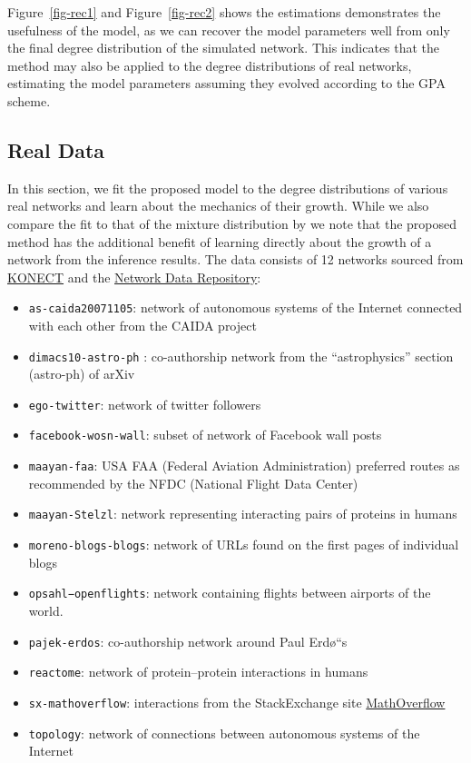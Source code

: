\documentclass[
  sn-basic,
]{sn-jnl}
\providecommand{\tightlist}{%
  \setlength{\itemsep}{0pt}\setlength{\parskip}{0pt}}
\theoremstyle{plain}
\theoremstyle{plain}
\theoremstyle{remark}
\begin{document}
Figure~\ref{fig-rec1} and Figure~\ref{fig-rec2} shows the estimations
demonstrates the usefulness of the model, as we can recover the model
parameters well from only the final degree distribution of the simulated
network. This indicates that the method may also be applied to the
degree distributions of real networks, estimating the model parameters
assuming they evolved according to the GPA scheme.

\subsection{Real Data}\label{sec-real}

In this section, we fit the proposed model to the degree distributions
of various real networks and learn about the mechanics of their growth.
While we also compare the fit to that of the mixture distribution by
\citet{Lee24} we note that the proposed method has the additional
benefit of learning directly about the growth of a network from the
inference results. The data consists of 12 networks sourced from
\href{konect.cc}{KONECT} and the
\href{https://networkrepository.com}{Network Data Repository}\citep{nr}:

\begin{itemize}
\tightlist
\item
  \texttt{as-caida20071105}: network of autonomous systems of the
  Internet connected with each other from the CAIDA project
\item
  \texttt{dimacs10-astro-ph} : co-authorship network from the
  ``astrophysics'' section (astro-ph) of arXiv
\item
  \texttt{ego-twitter}: network of twitter followers
\item
  \texttt{facebook-wosn-wall}: subset of network of Facebook wall posts
\item
  \texttt{maayan-faa}: USA FAA (Federal Aviation Administration)
  preferred routes as recommended by the NFDC (National Flight Data
  Center)
\item
  \texttt{maayan-Stelzl}: network representing interacting pairs of
  proteins in humans
\item
  \texttt{moreno-blogs-blogs}: network of URLs found on the first pages
  of individual blogs
\item
  \texttt{opsahl−openflights}: network containing flights between
  airports of the world.
\item
  \texttt{pajek-erdos}: co-authorship network around Paul Erd\o``s
\item
  \texttt{reactome}: network of protein--protein interactions in humans
\item
  \texttt{sx-mathoverflow}: interactions from the StackExchange site
  \href{https://mathoverflow.net/}{MathOverflow}
\item
  \texttt{topology}: network of connections between autonomous systems
  of the Internet
\end{itemize}
\end{document}
